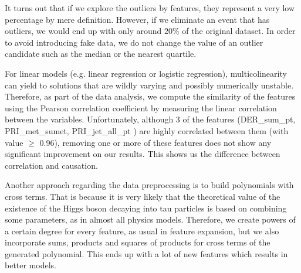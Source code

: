 \documentclass[10pt,conference,compsocconf]{IEEEtran}
\begin{document}
It turns out that if we explore the outliers by features, they represent a very low percentage by mere definition. However, if we eliminate an event that has outliers, we would end up with only around $20\%$ of the original dataset. In order to avoid introducing fake data, we do not change the value of an outlier candidate such as the median or the nearest quartile.



 For linear models (e.g. linear regression or logistic regression), multicolinearity can yield to solutions that are wildly varying and possibly numerically unstable. Therefore, as part of the data analysis, we compute the similarity of the features using the Pearson correlation coefficient by measuring the linear correlation between the variables. Unfortunately, although 3 of the features (DER\_sum\_pt, PRI\_met\_sumet, PRI\_jet\_all\_pt \cite{dataset}) are highly correlated between them (with value $\geq$ 0.96), removing one or more of these features does not show any significant improvement on our results. This shows us the difference between correlation and causation.

Another approach regarding the data preprocessing is to build polynomials with cross terms. That is because it is very likely that the theoretical value of the existence of the Higgs boson decaying into tau particles is based on combining some parameters, as in almost all physics models. Therefore, we create powers of a certain degree for every feature, as usual in feature expansion, but we also incorporate sums, products and squares of products for cross terms of the generated polynomial. This ends up with a lot of new features which results in better models.

\end{document}

